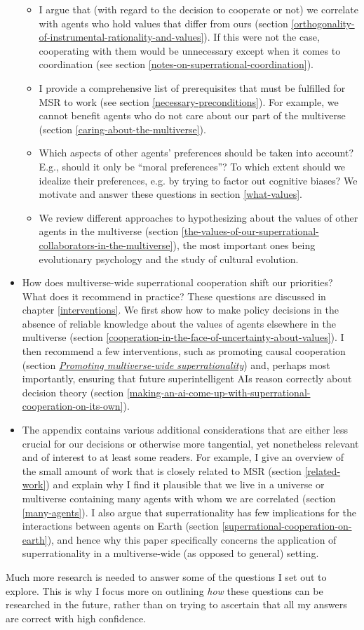 \begin{itemize}
  \begin{itemize}
  \item
    I argue that (with regard to the decision to cooperate or not) we
    correlate with agents who hold values that differ from ours (section
    \ref{orthogonality-of-instrumental-rationality-and-values}). If this were not the
    case, cooperating with them would be unnecessary except when it
    comes to coordination (see section
    \ref{notes-on-superrational-coordination}).
  \item
    I provide a comprehensive list of prerequisites that must be
    fulfilled for MSR to work (see section
    \ref{necessary-preconditions}).
    For example, we cannot benefit agents who do not care about our part
    of the multiverse (section
    \ref{caring-about-the-multiverse}).
  \item
    Which aspects of other agents' preferences should be taken into
    account? E.g., should it only be ``moral preferences''? To which
    extent should we idealize their preferences, e.g. by trying to
    factor out cognitive biases? We motivate and answer these questions
    in section \ref{what-values}.
  \item
    We review different approaches to hypothesizing about the values of
    other agents in the multiverse (section
    \ref{the-values-of-our-superrational-collaborators-in-the-multiverse}),
    the most important ones being evolutionary psychology and the study
    of cultural evolution.
  \end{itemize}
\item
  How does multiverse-wide superrational cooperation shift our
  priorities? What does it recommend in practice? These questions are
  discussed in chapter
  \ref{interventions}. We first
  show how to make policy decisions in the absence of reliable knowledge
  about the values of agents elsewhere in the multiverse (section
  \ref{cooperation-in-the-face-of-uncertainty-about-values}). I then
  recommend a few interventions, such as promoting causal cooperation
  (section \protect\hyperlink{_2jzyce2p07mk}{\emph{Promoting
  multiverse-wide superrationality}}) and, perhaps most importantly,
  ensuring that future superintelligent AIs reason correctly about
  decision theory (section
  \ref{making-an-ai-come-up-with-superrational-cooperation-on-its-own}).
\item
  The appendix contains various additional considerations that are
  either less crucial for our decisions or otherwise more tangential,
  yet nonetheless relevant and of interest to at least some readers. For
  example, I give an overview of the small amount of work that is
  closely related to MSR (section
  \ref{related-work}) and explain
  why I find it plausible that we live in a universe or multiverse
  containing many agents with whom we are correlated (section
  \ref{many-agents}). I also argue
  that superrationality has few implications for the interactions
  between agents on Earth (section
  \ref{superrational-cooperation-on-earth}), and hence why this paper specifically
  concerns the application of superrationality in a multiverse-wide (as
  opposed to general) setting.
\end{itemize}

Much more research is needed to answer some of the questions I set out
to explore. This is why I focus more on outlining \emph{how} these
questions can be researched in the future, rather than on trying to
ascertain that all my answers are correct with high confidence.

